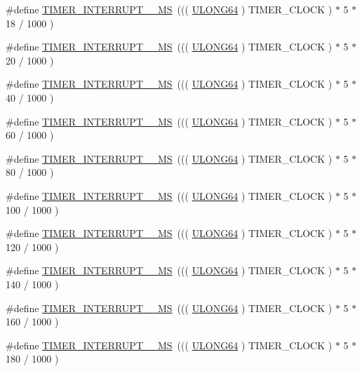 \begin{DoxyCompactItemize}
\item 
\#define \hyperlink{a00673_ga2cd73fada37ee4d173af1cb7dda9eca8}{TIMER\_\-INTERRUPT\_\_\-MS}~((( \hyperlink{a00660_ga28961430434ccabca6862ea93fe9a15b}{ULONG64} ) TIMER\_\-CLOCK ) $\ast$ 5 $\ast$ 18 / 1000 )
\item 
\#define \hyperlink{a00673_gad5a78b2ffba4f82dde6607a5cf7af659}{TIMER\_\-INTERRUPT\_\_\-MS}~((( \hyperlink{a00660_ga28961430434ccabca6862ea93fe9a15b}{ULONG64} ) TIMER\_\-CLOCK ) $\ast$ 5 $\ast$ 20 / 1000 )
\item 
\#define \hyperlink{a00673_ga59d6708c9cba03cf6fd9cf6c72529ab6}{TIMER\_\-INTERRUPT\_\_\-MS}~((( \hyperlink{a00660_ga28961430434ccabca6862ea93fe9a15b}{ULONG64} ) TIMER\_\-CLOCK ) $\ast$ 5 $\ast$ 40 / 1000 )
\item 
\#define \hyperlink{a00673_gaa4940d6bdf476029bda023939a17b096}{TIMER\_\-INTERRUPT\_\_\-MS}~((( \hyperlink{a00660_ga28961430434ccabca6862ea93fe9a15b}{ULONG64} ) TIMER\_\-CLOCK ) $\ast$ 5 $\ast$ 60 / 1000 )
\item 
\#define \hyperlink{a00673_ga876a37d4588162417327081c31249a09}{TIMER\_\-INTERRUPT\_\_\-MS}~((( \hyperlink{a00660_ga28961430434ccabca6862ea93fe9a15b}{ULONG64} ) TIMER\_\-CLOCK ) $\ast$ 5 $\ast$ 80 / 1000 )
\item 
\#define \hyperlink{a00673_gaa2d9363dd86d3618f88763c9a220b7a6}{TIMER\_\-INTERRUPT\_\_\-MS}~((( \hyperlink{a00660_ga28961430434ccabca6862ea93fe9a15b}{ULONG64} ) TIMER\_\-CLOCK ) $\ast$ 5 $\ast$ 100 / 1000 )
\item 
\#define \hyperlink{a00673_ga8911ab7a7dcc03f488617e3f11cd5d5b}{TIMER\_\-INTERRUPT\_\_\-MS}~((( \hyperlink{a00660_ga28961430434ccabca6862ea93fe9a15b}{ULONG64} ) TIMER\_\-CLOCK ) $\ast$ 5 $\ast$ 120 / 1000 )
\item 
\#define \hyperlink{a00673_ga444096811394aa490ec470aa1894e703}{TIMER\_\-INTERRUPT\_\_\-MS}~((( \hyperlink{a00660_ga28961430434ccabca6862ea93fe9a15b}{ULONG64} ) TIMER\_\-CLOCK ) $\ast$ 5 $\ast$ 140 / 1000 )
\item 
\#define \hyperlink{a00673_ga1d84a0363d80e46ecec3bf811837242b}{TIMER\_\-INTERRUPT\_\_\-MS}~((( \hyperlink{a00660_ga28961430434ccabca6862ea93fe9a15b}{ULONG64} ) TIMER\_\-CLOCK ) $\ast$ 5 $\ast$ 160 / 1000 )
\item 
\#define \hyperlink{a00673_gadb278155a97d15ad4ac348c292c9b60f}{TIMER\_\-INTERRUPT\_\_\-MS}~((( \hyperlink{a00660_ga28961430434ccabca6862ea93fe9a15b}{ULONG64} ) TIMER\_\-CLOCK ) $\ast$ 5 $\ast$ 180 / 1000 )
\item 

\end{DoxyCompactItemize}
